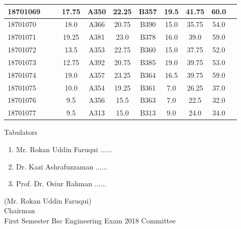 \documentclass[12pt]{article}
\begin{document}
\begin{center}
\begin{small}
\begin{tabular}{|l|c|c|c|c|c|c|c|c|c|c|}
18701069 &  &  & 17.75 & A350 & 22.25 & B357 & 19.5 & 41.75 & 60.0\\ \hline 
18701070 &  &  & 18.0 & A366 & 20.75 & B390 & 15.0 & 35.75 & 54.0\\ \hline 
18701071 &  &  & 19.25 & A381 & 23.0 & B378 & 16.0 & 39.0 & 59.0\\ \hline 
18701072 &  &  & 13.5 & A353 & 22.75 & B360 & 15.0 & 37.75 & 52.0\\ \hline 
18701073 &  &  & 12.75 & A392 & 20.75 & B385 & 19.0 & 39.75 & 53.0\\ \hline 
18701074 &  &  & 19.0 & A357 & 23.25 & B364 & 16.5 & 39.75 & 59.0\\ \hline 
18701075 &  &  & 10.0 & A354 & 19.25 & B361 & 7.0 & 26.25 & 37.0\\ \hline 
18701076 &  &  & 9.5 & A356 & 15.5 & B363 & 7.0 & 22.5 & 32.0\\ \hline 
18701077 &  &  & 9.5 & A313 & 15.0 & B313 & 9.0 & 24.0 & 34.0\\ \hline 
        \end{tabular}
            \end{small}
            \end{center}
  \centering
            
            \begin{table}[hb]
            	\centering
            \begin{minipage}[b]{0.5\linewidth} %
            {\centering Tabulators }
            \begin{enumerate}
                \item Mr. Rokan Uddin Faruqui \hspace*{1ex} $\ldots \ldots  $  
                \item Dr. Kazi Ashrafuzzaman \hspace*{1ex} $\ldots \ldots  $  
                \item Prof. Dr. Osiur Rahman \hspace*{1ex} $\ldots \ldots $  
            \end{enumerate} 

            \end{minipage}
            \hspace*{1.2cm}
            \begin{minipage}[b]{0.4\linewidth} \centering
            (Mr. Rokan Uddin Faruqui) \\
            Chairman  \hspace*{1ex} \\
           First Semester Bsc Engineering Exam 2018 Committee
            \end{minipage}
            \end{table}
            \clearpage
            \clearpage
            
\end{document}

